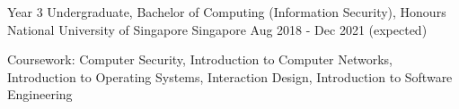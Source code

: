

\begin{cventries}

  \cventry
  {Year 3 Undergraduate, Bachelor of Computing (Information Security), Honours} %
  {National University of Singapore} %
  {Singapore} %
  {Aug 2018 - Dec 2021 (expected)} %
  {
    \begin{cvitems} %
      \item {Coursework: Computer Security, Introduction to Computer Networks, Introduction to Operating Systems, Interaction Design, Introduction to Software Engineering}
    \end{cvitems}
  }

\end{cventries}
